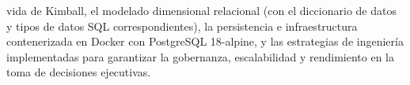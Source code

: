 vida de Kimball, el modelado dimensional relacional (con el diccionario de datos y tipos de datos SQL correspondientes), la persistencia e infraestructura contenerizada en Docker con PostgreSQL 18-alpine, y las estrategias de ingeniería implementadas para garantizar la gobernanza, escalabilidad y rendimiento en la toma de decisiones ejecutivas.